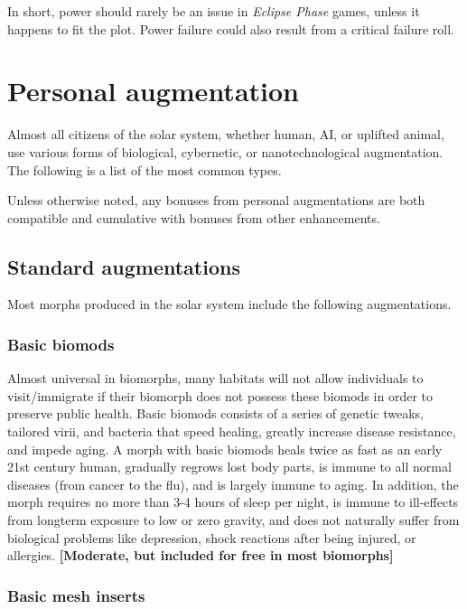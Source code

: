 In short, power should rarely be an issue in \emph{Eclipse Phase} games, unless it happens to fit the plot. Power failure could also result from a critical failure roll. 



\section{Personal augmentation} \label{sec:personal-augmentation} 

Almost all citizens of the solar system, whether human, AI, or uplifted animal, use various forms of biological, cybernetic, or nanotechnological augmentation. The following is a list of the most common types. 

Unless otherwise noted, any bonuses from personal augmentations are both compatible and cumulative with bonuses from other enhancements. 



\subsection{Standard augmentations} \label{sec:std-augmentations} 

Most morphs produced in the solar system include the following augmentations. 

\subsubsection{Basic biomods} 

Almost universal in biomorphs, many habitats will not allow individuals to visit/immigrate if their biomorph does not possess these biomods in order to preserve public health. Basic biomods consists of a series of genetic tweaks, tailored virii, and bacteria that speed healing, greatly increase disease resistance, and impede aging. A morph with basic biomods heals twice as fast as an early 21st century human, gradually regrows lost body parts, is immune to all normal diseases (from cancer to the flu), and is largely immune to aging. In addition, the morph requires no more than 3-4 hours of sleep per night, is immune to ill-effects from longterm exposure to low or zero gravity, and does not naturally suffer from biological problems like depression, shock reactions after being injured, or allergies. \textbf{[Moderate, but included for free in most biomorphs]} 

\subsubsection{Basic mesh inserts} 

